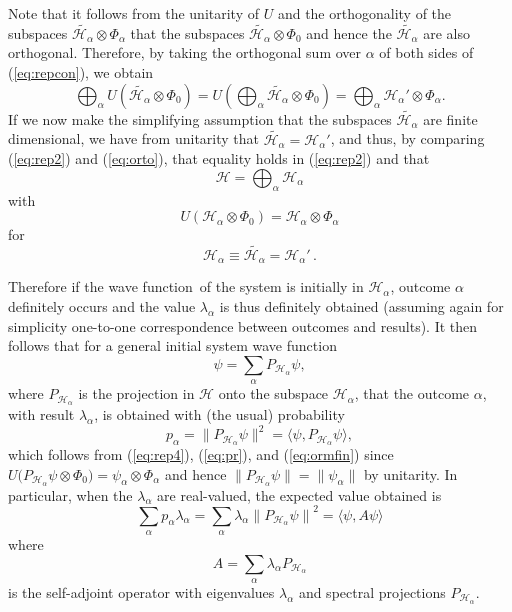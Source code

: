 \documentclass[12pt]{article}
\newcommand{\eq}[1]{(\ref{#1})}
\newcommand{\sa}{self-adjoint}
\newcommand{\wf}{wave function}
\renewcommand{\a}{\alpha}
\newcommand{\la}{\lambda_{\a}}
\newcommand{\suma}{\sum_{\a }}
\newcommand{\ot}{\otimes}
\newcommand{\biga}{\bigoplus_{\a}}
\newcommand{\psia}{\psi_{\a}}
\newcommand{\Phia}{\Phi_{\a}}
\newcommand{\Ha}{{\H}_{\a}}
\renewcommand{\H}{\mbox{$\mathcal{H}$}}
\newcommand{\Pa}{ P_{ {\mathcal{H}_{\a} } } }
\begin{document}
Note that it follows {}from the unitarity of $U$ and the orthogonality
of the subspaces $\widetilde{\Ha}\ot\Phia$ that the subspaces
$\widetilde{\mathcal{H}_{\a}}\ot\Phi_0$ and hence the
$\widetilde{\mathcal{H}_{\a}}$ are also orthogonal.  Therefore, by
taking the orthogonal sum over $\a$ of both sides of
(\ref{eq:repcon}), we obtain
\begin{equation}
\biga U(\widetilde{\mathcal{H}_{\a}}\ot\Phi_0)=  U \left( \biga
\widetilde{\mathcal{H}_{\a}}\ot\Phi_0\right) = \biga {\Ha}'\ot\Phia.
\label{eq:orto}
\end{equation}
If we now make the simplifying assumption that the subspaces
$\widetilde{\mathcal{H}_{\a}}$ are finite dimensional, we have {}from
unitarity that $ \widetilde{\mathcal{H}_{\a}}= {\Ha}'$, and thus, by
comparing \eq{eq:rep2} and (\ref{eq:orto}), that equality holds in
\eq{eq:rep2} and that
\begin{equation}
{\H}=\biga {\Ha}
\label{eq:sum}
\end{equation}
%
with
%
\begin{equation}
U({\H_\a} \ot \Phi_0 )=  {\Ha} \ot \Phia
\label{eq:rep4}
\end{equation}
%
for $$\Ha \equiv \widetilde{\mathcal{H}_{\a}}={\Ha}' \, .$$

Therefore if the \wf\ of the system is initially in $\H_\a$, outcome
$\a$ definitely occurs and the value $\lambda_\a$ is thus definitely
obtained (assuming again for simplicity one-to-one correspondence
between outcomes and results).  It then follows that for a general
initial system \wf
%
\begin{displaymath}
\psi =\suma \Pa \psi ,
\end{displaymath}
%
where $\Pa$ is the projection in $\H$ onto the subspace $\Ha$, that
the outcome $\a$, with result $\la$, is obtained with (the usual)
probability
%
\begin{equation}
p_\a = \| \Pa\psi\|^2= \langle\psi,\Pa \psi \rangle,
\label{eq:prr}
\end{equation}
%
which follows {}from (\ref{eq:rep4}), \eq{eq:pr}, and \eq{eq:ormfin}
since $U\big(\Pa\psi\ot\Phi_0\big) = \psia \ot\Phia$ and hence $ \|
\Pa\psi\| = \| \psia \|$ by unitarity.  In particular, when the $\la$
are real-valued, the expected value obtained is
%
\begin{equation}
\suma{p_\a \la}=\suma{\la{ \| \Pa \psi\|}^2} = \langle
\psi, A\psi \rangle \label{eq:meanz}
\end{equation}
%
where
%
\begin{equation}
A=\suma{\la \Pa}
\label{eq:A}
\end{equation}
is the \sa{} operator with eigenvalues $\la$ and spectral projections
$\Pa$.
\end{document}
